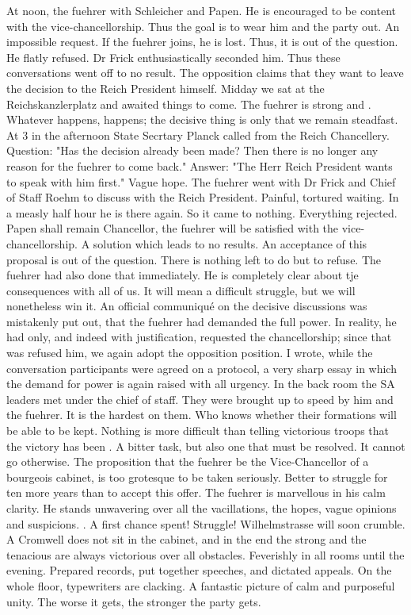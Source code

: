
At noon, the fuehrer with Schleicher and Papen. He is encouraged to be content with the vice-chancellorship. Thus the goal is to wear him and the party out. An impossible request. If the fuehrer joins, he is lost. Thus, it is out of the
question. He flatly refused. Dr Frick enthusiastically seconded him. Thus these conversations went off to no result. The opposition claims that they want to leave the decision to the Reich President himself. Midday we sat at the Reichskanzlerplatz and awaited things to come. The fuehrer is strong and . Whatever happens, happens; the decisive thing is only that we remain steadfast. At 3 in the afternoon State Secrtary Planck called from the Reich Chancellery. Question: "Has the decision already been made? Then there is no longer any reason for the fuehrer to come back." Answer: "The Herr Reich President wants to speak with him first." Vague hope. The fuehrer went with Dr Frick and Chief of Staff Roehm to discuss with the Reich President. Painful, tortured waiting. In a measly half hour he is there again. So it came to nothing. Everything rejected. Papen shall remain Chancellor, the fuehrer will be satisfied with the vice-chancellorship. A solution which leads to no results. An acceptance of this proposal is out of the question. There is nothing left to do but to refuse. The fuehrer had also done that immediately. He is completely clear about tje consequences with all of us. It will mean a difficult struggle, but we will nonetheless win it. An official communiqué on the decisive discussions was mistakenly put out, that the fuehrer had demanded the full power. In reality, he had only, and indeed with justification, requested the chancellorship; since that was refused him, we again adopt the opposition position. I wrote, while the conversation participants were agreed on a protocol, a very sharp essay in which the demand for power is again raised with all urgency. In the back room the SA leaders met under the chief of staff. They were brought up to speed by him and the fuehrer. It is  the hardest on them. Who knows whether their formations will be able to be kept. Nothing is more difficult than telling victorious troops that the victory has been . A bitter task, but also one that must be resolved. It cannot go otherwise. The proposition that the fuehrer be the Vice-Chancellor of a bourgeois cabinet, is too grotesque to be taken seriously. Better to struggle for ten more years than to accept this offer. The fuehrer is marvellous in his calm clarity. He stands unwavering over all the vacillations, the hopes, vague opinions and suspicions. . A first chance spent! Struggle! Wilhelmstrasse will soon crumble. A Cromwell does not sit in the cabinet, and in the end the strong and the tenacious are always victorious over all obstacles. Feverishly in all rooms until the evening. Prepared records, put together speeches, and dictated appeals. On the whole floor, typewriters are clacking. A fantastic picture of calm and purposeful unity. The worse it gets, the stronger the party gets. 
